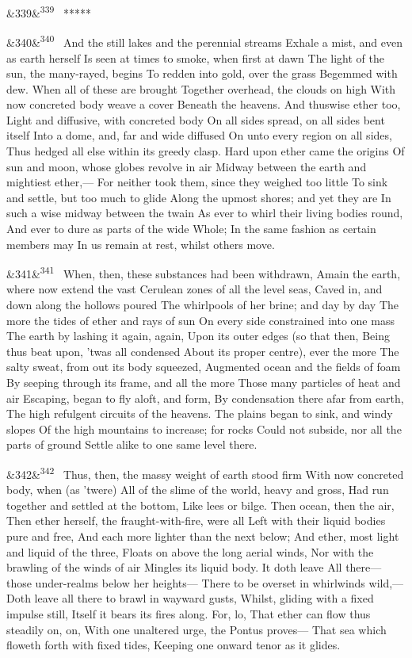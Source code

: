 \documentclass[12pt]{article}
\newcommand{\para}[1][]{\par\noindent\ifx&#1&\else\textsuperscript{\footnotesize #1}~\fi}
\begin{document}
\para[339] *****

\para[340] And the still lakes and the perennial streams Exhale a mist, and even as earth herself Is seen at times to smoke, when first at dawn The light of the sun, the many-rayed, begins To redden into gold, over the grass Begemmed with dew. When all of these are brought Together overhead, the clouds on high With now concreted body weave a cover Beneath the heavens. And thuswise ether too, Light and diffusive, with concreted body On all sides spread, on all sides bent itself Into a dome, and, far and wide diffused On unto every region on all sides, Thus hedged all else within its greedy clasp. Hard upon ether came the origins Of sun and moon, whose globes revolve in air Midway between the earth and mightiest ether,--- For neither took them, since they weighed too little To sink and settle, but too much to glide Along the upmost shores; and yet they are In such a wise midway between the twain As ever to whirl their living bodies round, And ever to dure as parts of the wide Whole; In the same fashion as certain members may In us remain at rest, whilst others move.

\para[341] When, then, these substances had been withdrawn, Amain the earth, where now extend the vast Cerulean zones of all the level seas, Caved in, and down along the hollows poured The whirlpools of her brine; and day by day The more the tides of ether and rays of sun On every side constrained into one mass The earth by lashing it again, again, Upon its outer edges (so that then, Being thus beat upon, 'twas all condensed About its proper centre), ever the more The salty sweat, from out its body squeezed, Augmented ocean and the fields of foam By seeping through its frame, and all the more Those many particles of heat and air Escaping, began to fly aloft, and form, By condensation there afar from earth, The high refulgent circuits of the heavens. The plains began to sink, and windy slopes Of the high mountains to increase; for rocks Could not subside, nor all the parts of ground Settle alike to one same level there.

\para[342] Thus, then, the massy weight of earth stood firm With now concreted body, when (as 'twere) All of the slime of the world, heavy and gross, Had run together and settled at the bottom, Like lees or bilge. Then ocean, then the air, Then ether herself, the fraught-with-fire, were all Left with their liquid bodies pure and free, And each more lighter than the next below; And ether, most light and liquid of the three, Floats on above the long aerial winds, Nor with the brawling of the winds of air Mingles its liquid body. It doth leave All there---those under-realms below her heights--- There to be overset in whirlwinds wild,--- Doth leave all there to brawl in wayward gusts, Whilst, gliding with a fixed impulse still, Itself it bears its fires along. For, lo, That ether can flow thus steadily on, on, With one unaltered urge, the Pontus proves--- That sea which floweth forth with fixed tides, Keeping one onward tenor as it glides.
\end{document}
